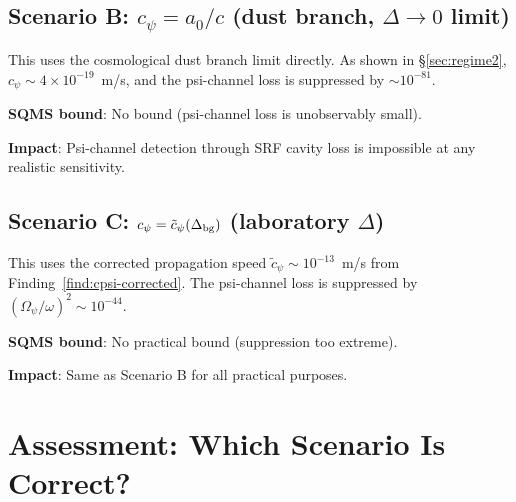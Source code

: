 \documentclass[11pt]{article}
\newcommand{\ee}[1]{\times 10^{#1}}
\newcommand{\Opsi}{\Omega_\psi}
\theoremstyle{definition}
\theoremstyle{remark}
\begin{document}
\subsection{Scenario B: $c_\psi = a_0/c$ (dust branch, $\Delta \to 0$ limit)}

This uses the cosmological dust branch limit directly. As shown in
\S\ref{sec:regime2}, $c_\psi \sim 4\ee{-19}$~m/s, and the
psi-channel loss is suppressed by $\sim 10^{-81}$.

\textbf{SQMS bound}: No bound (psi-channel loss is unobservably small).

\textbf{Impact}: Psi-channel detection through SRF cavity loss is
impossible at any realistic sensitivity.

\subsection{Scenario C: $c_\psi = \tilde{c}_\psi(\Delta_{\rm bg})$ (laboratory $\Delta$)}

This uses the corrected propagation speed $\tilde{c}_\psi \sim
10^{-13}$~m/s from Finding~\ref{find:cpsi-corrected}. The
psi-channel loss is suppressed by $(\Opsi/\omega)^2 \sim 10^{-44}$.

\textbf{SQMS bound}: No practical bound (suppression too extreme).

\textbf{Impact}: Same as Scenario B for all practical purposes.


\section{Assessment: Which Scenario Is Correct?}
\label{sec:assessment}
\end{document}
